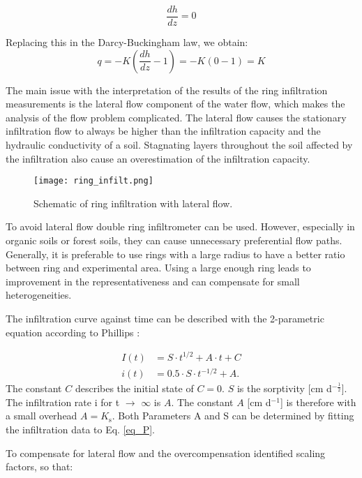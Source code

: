 \documentclass[
10pt, %
a4paper, %
oneside, %
headinclude,footinclude, %
BCOR5mm, %
]{scrartcl}
\begin{document}
\begin{equation}
\frac{dh}{dz}=0
\end{equation}

Replacing this in the Darcy-Buckingham law, we obtain:
\begin{equation}
q=-K (\frac{dh}{dz}-1)=-K(0-1)=K
\end{equation}

The main issue with the interpretation of the results of the ring infiltration measurements is the lateral flow component of the water flow, which makes the analysis of the flow problem complicated.
The lateral flow causes the stationary infiltration flow to always be higher than the infiltration capacity and the hydraulic conductivity of a soil. Stagnating layers throughout the soil affected by the infiltration also cause an overestimation of the infiltration capacity.

\begin{figure}[!h]
	\centering
	\texttt{[image: ring\_infilt.png]}
	\caption{\label{ring}Schematic of ring infiltration with lateral flow.}
\end{figure}


To avoid lateral flow double ring infiltrometer can be used. However, especially in organic soils or forest soils, they can cause unnecessary preferential flow paths. Generally, it is preferable to use rings with a large radius to have a better ratio between ring and experimental area. Using a large enough ring leads to improvement in the representativeness and can compensate for small heterogeneities.

The infiltration curve against time can be described with the 2-parametric equation according to Phillips \cite{philip1957}:

\begin{equation}\label{eq_P}
\begin{split}
I(t)&= S\cdot t^{1/2}+A\cdot t +C \\
i(t)&= 0.5 \cdot S \cdot t^{-1/2}+A.
\end{split}
\end{equation}
The constant $C$ describes the initial state of $C=0$. $S$ is the sorptivity [cm d$^{-\frac{1}{2}}$].
The infiltration rate i for t $\rightarrow$ $\infty$ is $A$. The constant $A$ [cm d$^{-1}$] is therefore with a small overhead $A=K_\mathrm{s}$. Both Parameters A and S can be determined by fitting the infiltration data to Eq. \ref{eq_P}.

To compensate for lateral flow and the overcompensation \cite{wu1997generalized} identified scaling factors, so that:
\end{document}

